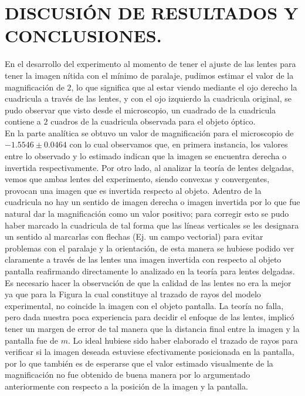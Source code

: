 \documentclass[10pt,a4paper]{article}
\begin{document}
\newpage

\section{DISCUSIÓN DE RESULTADOS Y CONCLUSIONES.} %
En el desarrollo del experimento al momento de tener el ajuste de las lentes para tener la imagen nítida con el mínimo de paralaje, pudimos estimar el valor de la magnificación de $2$, lo que significa que al estar viendo mediante el ojo derecho la cuadricula a través de las lentes, y con el ojo izquierdo la cuadricula original, se pudo observar que visto desde el microscopio, un cuadrado de la cuadricula contiene a $2$ cuadros de la cuadricula observada para el objeto óptico. \\[2mm]

En la parte analítica se obtuvo un valor de magnificación para el microscopio de $-1.5546 \pm 0.0464$ con lo cual observamos que, en primera instancia, los valores entre lo observado y lo estimado indican que la imagen se encuentra derecha o invertida respectivamente.
Por otro lado, al analizar la teoría de lentes delgadas, vemos que ambas lentes del experimento, siendo convexas y convergentes, provocan una imagen que es invertida respecto al objeto.
Adentro de la cuadricula no hay un sentido de imagen derecha o imagen invertida por lo que fue natural dar la magnificación como un valor positivo; para corregir esto se pudo haber marcado la cuadricula de tal forma que las líneas verticales se les designara un sentido al marcarlas con flechas (Ej. un campo vectorial) para evitar problemas con el paralaje y la orientación, de esta manera se hubiese podido ver claramente a través de las lentes una imagen invertida con respecto al objeto pantalla reafirmando directamente lo analizado en la teoría para lentes delgadas. \\[2mm]

Es necesario hacer la observación de que la calidad de las lentes no era la mejor ya que para la Figura la cual constituye al trazado de rayos del modelo experimental, no coincide la imagen con el objeto pantalla.
La teoría no falla, pero dada nuestra poca experiencia para decidir el enfoque de las lentes, implicó tener un margen de error de tal manera que la distancia final entre la imagen y la pantalla fue de $m$.
Lo ideal hubiese sido haber elaborado el trazado de rayos para verificar si la imagen deseada estuviese efectivamente posicionada en la pantalla, por lo que también es de esperarse que el valor estimado visualmente de la magnificación no fue obtenido de buena manera por lo argumentado anteriormente con respecto a la posición de la imagen y la pantalla.
\end{document}
